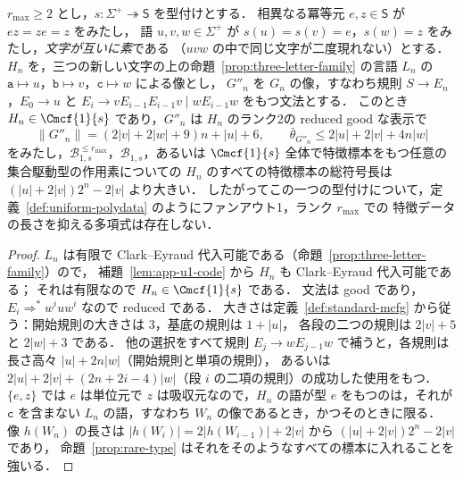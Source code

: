 \begin{corollary}
\label{cor:typing-level-obstruction}
$r_{\max}\ge2$ とし，$s:\Sigma^+\twoheadrightarrow\mathsf S$ を型付けとする．
相異なる冪等元 $e,z\in\mathsf S$ が $ez=ze=z$ をみたし，
語 $u,v,w\in\Sigma^+$ が $s(u)=s(v)=e$，$s(w)=z$ をみたし，\emph{文字が互いに素}である
（$uvw$ の中で同じ文字が二度現れない）とする．
$H_n$ を，三つの新しい文字の上の命題~\ref{prop:three-letter-family} の言語 $L_n$ の
$\mathtt a\mapsto u$，$\mathtt b\mapsto v$，$\mathtt c\mapsto w$ による像とし，
$G''_n$ を $G_n$ の像，すなわち規則 $S\to E_n$，$E_0\to u$ と
$E_i\to vE_{i-1}E_{i-1}v\mid wE_{i-1}w$ をもつ文法とする．
このとき $H_n\in\Cmcf{1}{s}$ であり，$G''_n$ は $H_n$ のランク2の reduced good な表示で
\[
 \|G''_n\|=(2|v|+2|w|+9)n+|u|+6,\qquad
 \bar\theta_{G''_n}\le2|u|+2|v|+4n|w|
\]
をみたし，$\mathcal B^{\le r_{\max}}_{1,s}$，$\mathcal B_{1,s}$，あるいは $\Cmcf{1}{s}$ 全体で特徴標本をもつ任意の集合駆動型の作用素についての
$H_n$ のすべての特徴標本の総符号長は $(|u|+2|v|)2^n-2|v|$ より大きい．
したがってこの一つの型付けについて，定義~\ref{def:uniform-polydata} のようにファンアウト1，ランク $r_{\max}$ での
特徴データの長さを抑える多項式は存在しない．
\end{corollary}

\begin{proof}
$L_n$ は有限で Clark--Eyraud 代入可能である（命題~\ref{prop:three-letter-family}）ので，
補題~\ref{lem:app-u1-code} から $H_n$ も Clark--Eyraud 代入可能である；
それは有限なので $H_n\in\Cmcf{1}{s}$ である．
文法は good であり，$E_i\Rightarrow^*w^iuw^i$ なので reduced である．
大きさは定義~\ref{def:standard-mcfg} から従う：開始規則の大きさは $3$，基底の規則は $1+|u|$，
各段の二つの規則は $2|v|+5$ と $2|w|+3$ である．
他の選択をすべて規則 $E_j\to wE_{j-1}w$ で補うと，各規則は長さ高々 $|u|+2n|w|$（開始規則と単項の規則），
あるいは $2|u|+2|v|+(2n+2i-4)|w|$（段 $i$ の二項の規則）の成功した使用をもつ．
$\{e,z\}$ では $e$ は単位元で $z$ は吸収元なので，$H_n$ の語が型 $e$ をもつのは，それが
$\mathtt c$ を含まない $L_n$ の語，すなわち $W_n$ の像であるとき，かつそのときに限る．
像 $h(W_n)$ の長さは $|h(W_i)|=2|h(W_{i-1})|+2|v|$ から $(|u|+2|v|)2^n-2|v|$ であり，
命題~\ref{prop:rare-type} はそれをそのようなすべての標本に入れることを強いる．
\end{proof}

